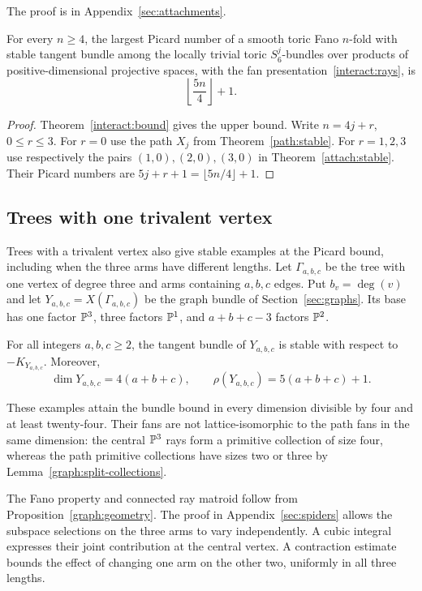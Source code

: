 The proof is in Appendix~\ref{sec:attachments}.

\begin{corollary}\label{attach:sharp}
For every $n\ge4$, the largest Picard number of a smooth toric Fano
$n$-fold with stable tangent bundle among the locally trivial toric
$S_6^j$-bundles over products of positive-dimensional projective spaces,
with the fan presentation~\eqref{interact:rays}, is
\[
 \left\lfloor\frac{5n}{4}\right\rfloor+1.
\]
\end{corollary}
\begin{proof}
Theorem~\ref{interact:bound} gives the upper bound. Write $n=4j+r$,
$0\le r\le3$. For $r=0$ use the path $X_j$ from
Theorem~\ref{path:stable}. For $r=1,2,3$ use respectively the pairs
$(1,0),(2,0),(3,0)$ in Theorem~\ref{attach:stable}. Their Picard
numbers are $5j+r+1=\lfloor5n/4\rfloor+1$.
\end{proof}

\subsection{Trees with one trivalent vertex}

Trees with a trivalent vertex also give stable examples at the Picard
bound, including when the three arms have different lengths.
Let $\Gamma_{a,b,c}$ be the tree
with one vertex of degree three and arms containing $a,b,c$ edges.
Put $b_v=\deg(v)$ and let $Y_{a,b,c}=X(\Gamma_{a,b,c})$ be the graph
bundle of Section~\ref{sec:graphs}. Its base has one factor $\mathbb{P}^3$,
three factors $\mathbb{P}^1$, and $a+b+c-3$ factors $\mathbb{P}^2$.

\begin{theorem}\label{spider:stable}
For all integers $a,b,c\ge2$, the tangent bundle of $Y_{a,b,c}$ is
stable with respect to $-K_{Y_{a,b,c}}$. Moreover,
\[
 \dim Y_{a,b,c}=4(a+b+c),\qquad
 \rho(Y_{a,b,c})=5(a+b+c)+1.
\]
\end{theorem}

These examples attain the bundle bound in every dimension divisible
by four and at least twenty-four. Their fans are not lattice-isomorphic
to the path fans in the same dimension:
the central $\mathbb{P}^3$ rays form a primitive collection of size four,
whereas the path primitive collections have sizes two or three by
Lemma~\ref{graph:split-collections}.

The Fano property and connected ray matroid follow from
Proposition~\ref{graph:geometry}. The proof in
Appendix~\ref{sec:spiders} allows the subspace selections on the three
arms to vary independently. A cubic integral expresses their joint
contribution at the central vertex. A contraction estimate bounds the
effect of changing one arm on the other two, uniformly in all three
lengths.

